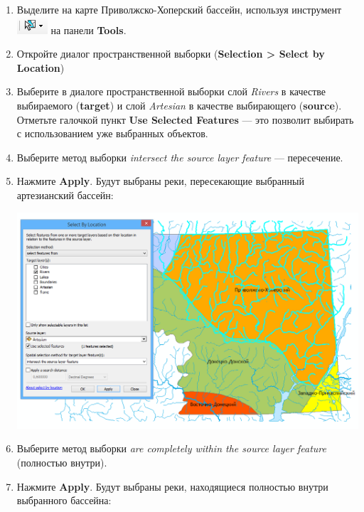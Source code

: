\documentclass[]{book}
\theoremstyle{definition}
\theoremstyle{definition}
\theoremstyle{definition}
\theoremstyle{remark}
\begin{document}
\begin{enumerate}
\def\labelenumi{\arabic{enumi}.}
\item
  Выделите на карте Приволжско-Хоперский бассейн, используя инструмент
  \includegraphics{images/Ex06/image15.png} на панели \textbf{Tools}.
\item
  Откройте диалог пространственной выборки (\textbf{Selection
  \textgreater{} Select by Location})
\item
  Выберите в диалоге пространственной выборки слой \emph{Rivers} в
  качестве выбираемого (\textbf{target}) и слой \emph{Artesian} в
  качестве выбирающего (\textbf{source}). Отметьте галочкой пункт
  \textbf{Use Selected Features} --- это позволит выбирать с
  использованием уже выбранных объектов.
\item
  Выберите метод выборки \emph{intersect the source layer feature} ---
  пересечение.
\item
  Нажмите \textbf{Apply}. Будут выбраны реки, пересекающие выбранный
  артезианский бассейн:

  \includegraphics{images/Ex06/image16.png}
\item
  Выберите метод выборки \emph{are completely within the source layer
  feature} (полностью внутри).
\item
  Нажмите \textbf{Apply}. Будут выбраны реки, находящиеся полностью
  внутри выбранного бассейна:


\end{enumerate}
\end{document}
